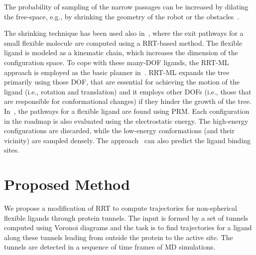 \documentclass[usletter, 10pt, conference]{ieeeconf} %
\begin{document}
The probability of sampling of the narrow passages can be increased by dilating the free-space, e.g., by shrinking the geometry of the robot or the obstacles~\cite{bayazitIRC}.

The shrinking technique has been used also in~\cite{cortes2010simulating}, where the exit pathways for a small flexible molecule are computed using a RRT-based method.
The flexible ligand is modeled as a kinematic chain, which increases the dimension of the configuration space.
To cope with these many-DOF ligands, the RRT-ML~\cite{cortes2007mlrrt} approach is employed as the basic planner in~\cite{cortes2010simulating}.
RRT-ML expands the tree primarily using those DOF, that are essential for achieving the motion of the ligand (i.e., rotation
and translation) and it employs other DOFs (i.e., those that are responsible for conformational changes) if they hinder the growth of the tree.
In~\cite{singhLIG}, the pathways for a flexible ligand are found using PRM.
Each configuration in the roadmap is also evaluated using the electrostatic energy.
The high-energy configurations are discarded, while the low-energy conformations (and their vicinity) are sampled densely.
The approach~\cite{singhLIG} can also predict the ligand binding sites.



\section{Proposed Method}
We propose a modification of RRT to compute trajectories for non-spherical flexible ligands through protein tunnels.
The input is formed by a set of tunnels computed using Voronoi diagrams and the task is to find trajectories for a ligand along these tunnels
leading from outside the protein to the active site.
The tunnels are detected in a sequence of time frames of MD simulations.
\end{document}

